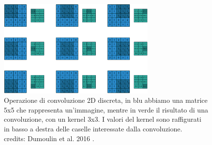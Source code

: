 \vspace{1cm}
\begin{figure}[h]
    \centering
    \includegraphics[width=0.7\textwidth]{imgs/kernel_convolution.png}
    \caption{Operazione di convoluzione 2D discreta, in blu abbiamo una matrice 5x5 che rappresenta un'immagine, mentre in verde il risultato di una convoluzione,
    con un kernel 3x3. I valori del kernel sono raffigurati in basso a destra delle caselle interessate dalla convoluzione.\\
    credits: Dumoulin et al. 2016 \cite{dumoulin2016guide}.}
    \label{fig:convolution_schematic}
\end{figure} 

